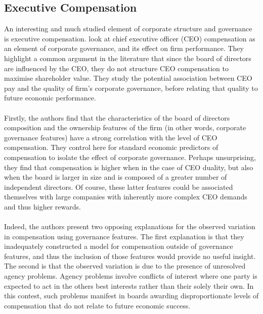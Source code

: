 \subsection {Executive Compensation}\label{execComp}
{An interesting and much studied element of corporate structure and governance is executive compensation. \cite{coreCompensation} look at chief executive officer (CEO) compensation as an element of corporate governance, and its effect on firm performance. They highlight a common argument in the literature that since the board of directors are influenced by the CEO, they do not structure CEO compensation to maximise shareholder value. They study the potential association between CEO pay and the quality of firm's corporate governance, before relating that quality to future economic performance. \\\\
Firstly, the authors find that the characteristics of the board of directors composition and the ownership features of the firm (in other words, corporate governance features) have a strong correlation with the level of CEO compensation. They control here for standard economic predictors of compensation to isolate the effect of corporate governance. Perhaps unsurprising, they find that compensation is higher when in the case of CEO duality, but also when the board is larger in size and is composed of a greater number of independent directors. Of course, these latter features could be associated themselves with large companies with inherently more complex CEO demands and thus higher rewards. \\\\
Indeed, the authors present two opposing explanations for the observed variation in compensation using governance features. The first explanation is that they inadequately constructed a model for compensation outside of governance features, and thus the inclusion of those features would provide no useful insight. The second is that the observed variation is due to the presence of unresolved agency problems. Agency problems involve conflicts of interest where one party is expected to act in the others best interests rather than their solely their own. In this contest, such problems manifest in boards awarding disproportionate levels of compensation that do not relate to future economic success. \\\\
}
